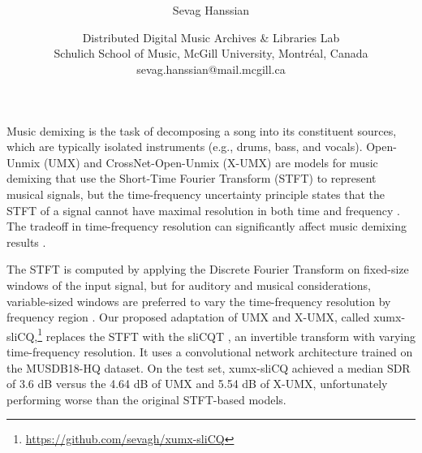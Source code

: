 \documentclass[letter,12pt]{article}
\title{\vspace{-2.25em}\textbf{\ThesisTitle}\vspace{-0.75em}}
\author{Sevag Hanssian}
\date{
\vspace{-0.75em}
\small{
Distributed Digital Music Archives \& Libraries Lab\\
Schulich School of Music, McGill University, Montr{\'e}al, Canada\\
}
\footnotesize{sevag.hanssian@mail.mcgill.ca}
\vspace{-1.25em}
}
\begin{document}
\maketitle

Music demixing is the task of decomposing a song into its constituent sources, which are typically isolated instruments (e.g., drums, bass, and vocals). Open-Unmix (UMX) \parencite{umx} and CrossNet-Open-Unmix (X-UMX) \parencite{xumx} are models for music demixing that use the Short-Time Fourier Transform (STFT) to represent musical signals, but the time-frequency uncertainty principle states that the STFT of a signal cannot have maximal resolution in both time and frequency \parencite{gabor1946}. The tradeoff in time-frequency resolution can significantly affect music demixing results \parencite{tftradeoff1}.

The STFT is computed by applying the Discrete Fourier Transform on fixed-size windows of the input signal, but for auditory and musical considerations, variable-sized windows are preferred to vary the time-frequency resolution by frequency region \parencite{doerflerphd}. Our proposed adaptation of UMX and X-UMX, called xumx-sliCQ,\footnote{\url{https://github.com/sevagh/xumx-sliCQ}} replaces the STFT with the sliCQT \parencite{slicq}, an invertible transform with varying time-frequency resolution. It uses a convolutional network architecture \parencite{plumbley2} trained on the MUSDB18-HQ \parencite{musdb18hq} dataset. On the test set, xumx-sliCQ achieved a median SDR of 3.6 dB versus the 4.64 dB of UMX and 5.54 dB of X-UMX, unfortunately performing worse than the original STFT-based models.

\begingroup
{}
\setlength\bibitemsep{0.015em}
\printbibliography
\endgroup
\end{document}
